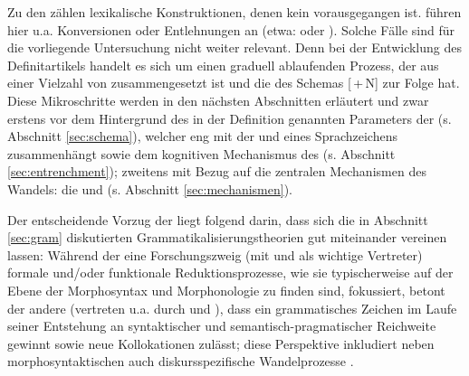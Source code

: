 \noindent
Zu den  zählen lexikalische Konstruktionen, denen kein  vorausgegangen ist. \textcite[3]{Traugott2013} führen hier u.a. Konversionen oder Entlehnungen an (etwa:  oder ). Solche Fälle sind für die vorliegende Untersuchung nicht weiter relevant. Denn bei der Entwicklung des Definitartikels handelt es sich um einen graduell ablaufenden Prozess, der aus einer Vielzahl von  zusammengesetzt ist und die  des Schemas  [\,+\,N]  zur Folge hat. Diese Mikroschritte werden in den nächsten Abschnitten erläutert und zwar erstens vor dem Hintergrund des in der Definition genannten Parameters der  (s. Abschnitt \ref{sec:schema}), welcher eng mit der  und  eines Sprachzeichens zusammenhängt sowie dem kognitiven Mechanismus des   (s.  Abschnitt \ref{sec:entrenchment}); zweitens mit Bezug auf die zentralen Mechanismen des Wandels: die  und  (s. Abschnitt \ref{sec:mechanismen}). 

Der entscheidende Vorzug der  liegt \textcite[60--62]{Traugott2015} folgend darin, dass sich die in Abschnitt \ref{sec:gram}  diskutierten Grammatikalisierungstheorien gut miteinander vereinen lassen: Während der eine Forschungszweig (mit \citealt{Lehmann1995} und \citealt{Haspelmath2004} als wichtige Vertreter) formale und\slash oder funktionale Reduktionsprozesse, wie sie typischerweise auf der Ebene der Morphosyntax und Morphonologie zu finden sind, fokussiert, betont der andere (vertreten u.a. durch \citealt{Himmelmann2004} und \citealt{Croft2006}), dass ein grammatisches Zeichen im Laufe seiner Entstehung an syntaktischer und semantisch-pragmatischer Reichweite gewinnt sowie neue Kollokationen zulässt; diese Perspektive inkludiert neben morphosyntaktischen auch diskursspezifische Wandelprozesse \parencite[vgl. den Begriff der  für die Entwicklung von Diskursmarkern bei][]{Auer2005}. 

